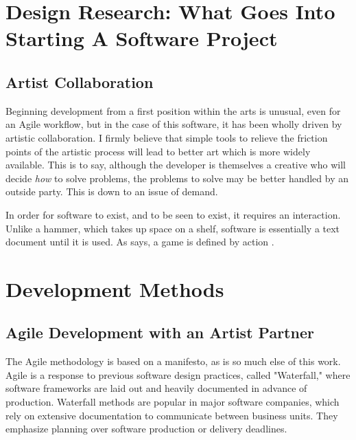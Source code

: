 \section{Design Research: What Goes Into Starting A Software Project}

\subsection{Artist Collaboration}

Beginning development from a first position within the arts is unusual, even for an Agile workflow, but in the case of this software, it has been wholly driven by artistic collaboration. I firmly believe that simple tools to relieve the friction points of the artistic process will lead to better art which is more widely available. This is to say, although the developer is themselves a creative who will decide \textit{how} to solve problems, the problems to solve may be better handled by an outside party. This is down to an issue of demand. 

In order for software to exist, and to be seen to exist, it requires an interaction. Unlike a hammer, which takes up space on a shelf, software is essentially a text document until it is used. As \citeauthor{galloway}says, a game is defined by action \citeyear{galloway}. \cite{galloway}


\section{Development Methods}
\subsection{Agile Development with an Artist Partner}
The Agile methodology is based on a manifesto, as is so much else of this work. Agile is a response to previous software design practices, called "Waterfall," where software frameworks are laid out and heavily documented in advance of production. Waterfall methods are popular in major software companies, which rely on extensive documentation to communicate between business units. They emphasize planning over software production or delivery deadlines. 

